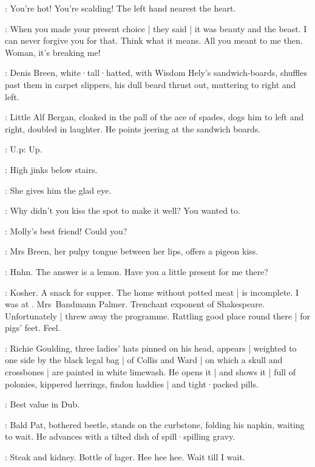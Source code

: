 \MrsBreen:
You're hot!
You're scalding!
The left hand nearest the heart.

\Bloom:
When you made your present choice |
they said |
it was beauty and the beast.
I can never forgive you for that.
Think what it means.
All you meant to me then.
Woman,
it's breaking me!

:
Denis Breen,
white·tall·hatted,
with Wisdom Hely's sandwich-boards,
shuffles past them in carpet slippers,
his dull beard thrust out,
muttering to right and left.

:
Little Alf Bergan,
cloaked in the pall of the ace of spades,
dogs him to left and right,
doubled in laughter.
He points jeering at the sandwich boards.

\AlfBergan:
U.p:
Up.

\MrsBreen:
High jinks below stairs.

:
She gives him the glad eye.

\MrsBreen:
Why didn't you kiss the spot to make it well?
You wanted to.

\Bloom:
Molly's best friend!
Could you?

:
Mrs Breen,
her pulpy tongue between her lips,
offers a pigeon kiss.

\MrsBreen:
Hnhn.
The answer is a lemon.
Have you a little present for me there?

\Bloom:
Kosher.
A snack for supper.
The home without potted meat |
is incomplete.
I was at .
Mrs~Bandmann Palmer.
Trenchant exponent of Shakespeare.
Unfortunately |
threw away the programme.
Rattling good place round there |
for pigs' feet.
Feel.

:
Richie Goulding,
three ladies' hats pinned on his head,
appears |
weighted to one side by the black legal bag |
of 
Collis and Ward |
on which a skull and crossbones |
are painted in white limewash.
He opens it |
and shows it |
full of polonies,
kippered herrings,
findon haddies |
and tight·packed pills.

\Richie:
Best value in Dub.

:
Bald Pat,
bothered beetle,
stands on the curbstone,
folding his napkin,
waiting to wait.
He advances with a tilted dish of spill·spilling gravy.

\Pat:
Steak and kidney.
Bottle of lager.
Hee hee hee.
Wait till I wait.

